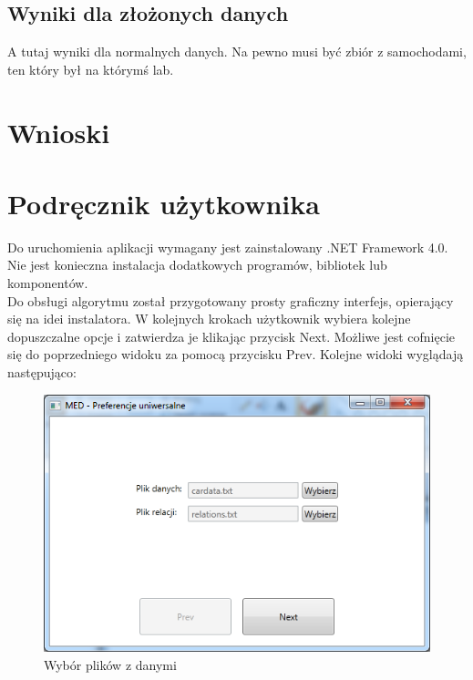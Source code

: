 \documentclass[a4paper,12pt]{article}
\begin{document}
\subsection{Wyniki dla złożonych danych}

A tutaj wyniki dla normalnych danych. Na pewno musi być zbiór z samochodami, ten który był na którymś lab.

\section{Wnioski}

\appendix
\section{Podręcznik użytkownika}

Do uruchomienia aplikacji wymagany jest zainstalowany .NET Framework 4.0. Nie jest konieczna instalacja dodatkowych programów, bibliotek lub komponentów.\\

Do obsługi algorytmu został przygotowany prosty graficzny interfejs, opierający
się na idei instalatora. W kolejnych krokach użytkownik wybiera kolejne dopuszczalne opcje i zatwierdza je klikając przycisk Next. Możliwe jest cofnięcie się do poprzedniego widoku za pomocą przycisku Prev. Kolejne widoki wyglądają następująco:

\begin{figure}[h!]
\begin{center}
\includegraphics[width=\textwidth]{img/1.png}
\caption{Wybór plików z danymi}
\label{krok1}
\end{center}
\end{figure}
\end{document}
